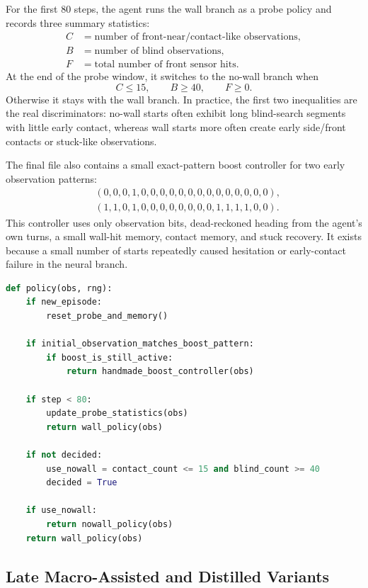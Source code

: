 \documentclass[11pt]{article}
\begin{document}
For the first 80 steps, the agent runs the wall branch as a probe policy and records
three summary statistics:
\[
\begin{aligned}
  C &= \text{number of front-near/contact-like observations},\\
  B &= \text{number of blind observations},\\
  F &= \text{total number of front sensor hits}.
\end{aligned}
\]
At the end of the probe window, it switches to the no-wall branch when
\[
  C \le 15,
  \qquad
  B \ge 40,
  \qquad
  F \ge 0.
\]
Otherwise it stays with the wall branch. In practice, the first two inequalities are the
real discriminators: no-wall starts often exhibit long blind-search segments with little
early contact, whereas wall starts more often create early side/front contacts or
stuck-like observations.

The final file also contains a small exact-pattern boost controller for two early
observation patterns:
\[
\begin{aligned}
  &(0,0,0,1,0,0,0,0,0,0,0,0,0,0,0,0,0,0),\\
  &(1,1,0,1,0,0,0,0,0,0,0,0,1,1,1,1,0,0).
\end{aligned}
\]
This controller uses only observation bits, dead-reckoned heading from the agent's own
turns, a small wall-hit memory, contact memory, and stuck recovery. It exists because a
small number of starts repeatedly caused hesitation or early-contact failure in the neural
branch.

\begin{lstlisting}[language=Python,caption={High-level final policy logic.}]
def policy(obs, rng):
    if new_episode:
        reset_probe_and_memory()

    if initial_observation_matches_boost_pattern:
        if boost_is_still_active:
            return handmade_boost_controller(obs)

    if step < 80:
        update_probe_statistics(obs)
        return wall_policy(obs)

    if not decided:
        use_nowall = contact_count <= 15 and blind_count >= 40
        decided = True

    if use_nowall:
        return nowall_policy(obs)
    return wall_policy(obs)
\end{lstlisting}

\subsection{Late Macro-Assisted and Distilled Variants}
\end{document}
